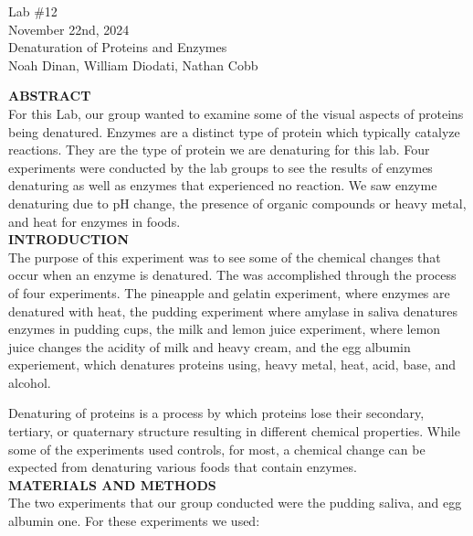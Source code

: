 \documentclass[12pt]{article}
\begin{document}

\begin{center}
\vspace*{\fill}
Lab \#12\\
November 22nd, 2024\\
Denaturation of Proteins and Enzymes\\
Noah Dinan, William Diodati, Nathan Cobb\\
\vspace*{\fill}
\end{center}

\newpage
{}

\setlength{\parindent}{0in}

\textbf{ABSTRACT}\\
For this Lab, our group wanted to examine some of the visual aspects of proteins being denatured. 
Enzymes are a distinct type of protein which typically catalyze reactions. They are the type
of protein we are denaturing for this lab. Four experiments were conducted by the lab groups to
see the results of enzymes denaturing as well as enzymes that experienced no reaction.
We saw enzyme denaturing due to pH change, the presence of organic compounds or heavy metal, and heat for enzymes in foods.\\

\textbf{INTRODUCTION}\\
The purpose of this experiment was to see some of the chemical changes that occur when an 
enzyme is denatured. The was accomplished through the process of four experiments. The pineapple and
gelatin experiment, where enzymes are denatured with heat, the pudding experiment where amylase in saliva denatures
enzymes in pudding cups, the milk and lemon juice experiment, where lemon juice changes the acidity of milk
and heavy cream, and the egg albumin experiement, which denatures proteins using, heavy metal, heat, acid, base, and alcohol.

Denaturing of proteins is a process by which proteins lose their secondary, tertiary, or quaternary structure resulting
in different chemical properties. While some of the experiments used controls, for most, a chemical change can be expected from
denaturing various foods that contain enzymes.\\

\textbf{MATERIALS AND METHODS}\\
The two experiments that our group conducted were the pudding saliva, and egg albumin one.
For these experiments we used:
\end{document}
